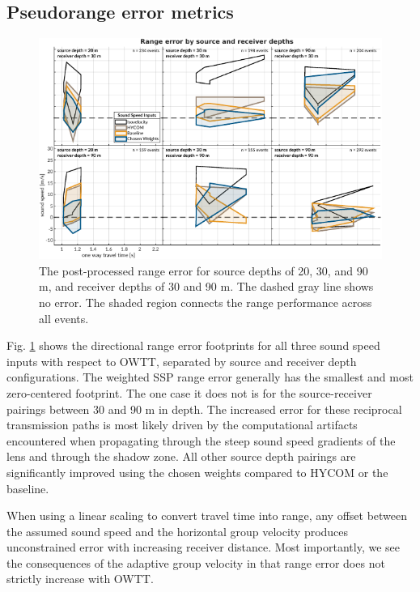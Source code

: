 \subsection{Pseudorange error metrics}

\begin{figure}[!ht]
\includegraphics[width=\textwidth]{figs/range-error-allMethods.pdf}
\caption{The post-processed range error for source depths of 20, 30, and 90 m, and receiver depths of 30 and 90 m. The dashed gray line shows no error. The shaded region connects the range performance across all events.}
\label{fig:rangeError}
\end{figure}

Fig. \ref{fig:rangeError} shows the directional range error footprints for all three sound speed inputs with respect to OWTT, separated by source and receiver depth configurations.
The weighted SSP range error generally has the smallest and most zero-centered footprint.
The one case it does not is for the source-receiver pairings between 30 and 90 m in depth.
The increased error for these reciprocal transmission paths is most likely driven by the computational artifacts encountered when propagating through the steep sound speed gradients of the lens and through the shadow zone.
All other source depth pairings are significantly improved using the chosen weights compared to HYCOM or the baseline.

When using a linear scaling to convert travel time into range, any offset between the assumed sound speed and the horizontal group velocity produces unconstrained error with increasing receiver distance.
Most importantly, we see the consequences of the adaptive group velocity in that range error does not strictly increase with OWTT.

